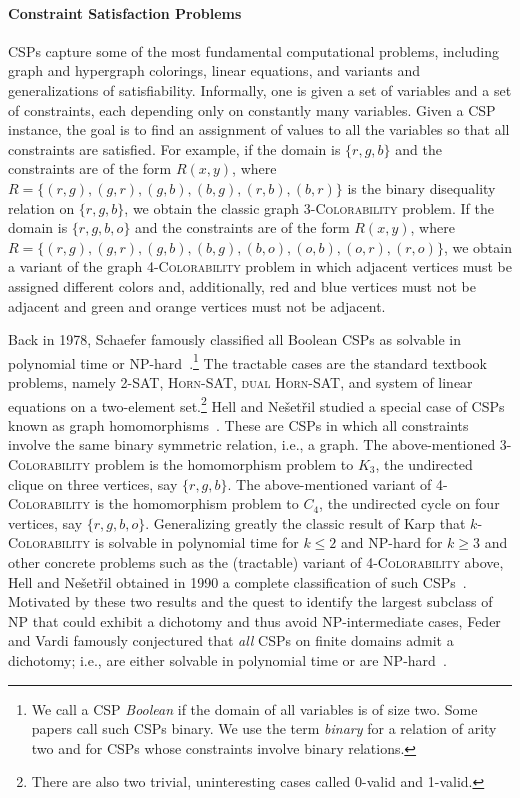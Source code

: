 \documentclass[11pt,letter]{article}
\begin{document}
\paragraph{Constraint Satisfaction Problems}
CSPs capture some of the most fundamental
computational problems, including graph and hypergraph colorings, linear
equations, and variants and generalizations of satisfiability. Informally, one
is given a set of variables and a set of constraints, each depending only on
constantly many variables. Given a CSP instance, the goal is to find an assignment
of values to all the variables so that all constraints are satisfied. For
example, if the domain is $\{r,g,b\}$ and the constraints are of the form
$R(x,y)$, where $R=\{(r,g),(g,r),(g,b),(b,g),(r,b),(b,r)\}$ is the binary disequality relation on $\{r,g,b\}$, we obtain
the classic graph \textsc{3-Colorability}
problem. If the domain is $\{r,g,b,o\}$ and the
constraints are of the form $R(x,y)$, where
$R=\{(r,g),(g,r),(g,b),(b,g),(b,o),(o,b),(o,r),(r,o)\}$,
we obtain a variant of
the graph \textsc{4-Colorability} problem in which adjacent vertices must be
assigned different colors and, additionally, red and blue vertices must not be adjacent
and green and orange vertices must not be adjacent. 

Back in 1978, Schaefer famously classified all Boolean CSPs as solvable in
polynomial time or NP-hard~\cite{Schaefer78:stoc}.\footnote{We call a CSP
\emph{Boolean} if the domain of all variables is of size two. Some papers call
such CSPs binary. We use the term \emph{binary} for a relation of arity two and
for CSPs whose constraints involve binary relations.} The
tractable cases are the standard textbook problems, namely 
\textsc{2-SAT}, \textsc{Horn-SAT}, \textsc{dual
Horn-SAT}, and system of linear equations on a two-element set.\footnote{There
are also two trivial, uninteresting cases called 0-valid and 1-valid.} 
Hell and Ne\v{s}et\v{r}il studied a special case of CSPs known
as graph homomorphisms~\cite{hell2004graphs}. These are CSPs in which all constraints
involve the same binary symmetric relation, i.e., a graph. The above-mentioned 
\textsc{3-Colorability} problem is the homomorphism problem to $K_3$,
the undirected clique on three vertices, say $\{r,g,b\}$. The above-mentioned
variant of \textsc{4-Colorability} is the homomorphism problem to $C_4$, the
undirected cycle on four vertices, say $\{r,g,b,o\}$. Generalizing greatly
the classic result of Karp that \textsc{$k$-Colorability} is solvable in polynomial time for $k\leq 2$ and NP-hard
for $k\geq 3$ and other concrete problems such as the (tractable) variant of
\textsc{4-Colorability} above, Hell and Ne\v{s}et\v{r}il obtained in
1990 a complete classification of such CSPs~\cite{HellN90}.
Motivated by these two results and the quest to identify the largest subclass of
NP that could exhibit a dichotomy and thus avoid NP-intermediate cases, Feder
and Vardi famously conjectured that \emph{all} CSPs on finite domains admit a
dichotomy; i.e., are either solvable in polynomial time or are
NP-hard~\cite{Feder98:monotone}.
\end{document}
